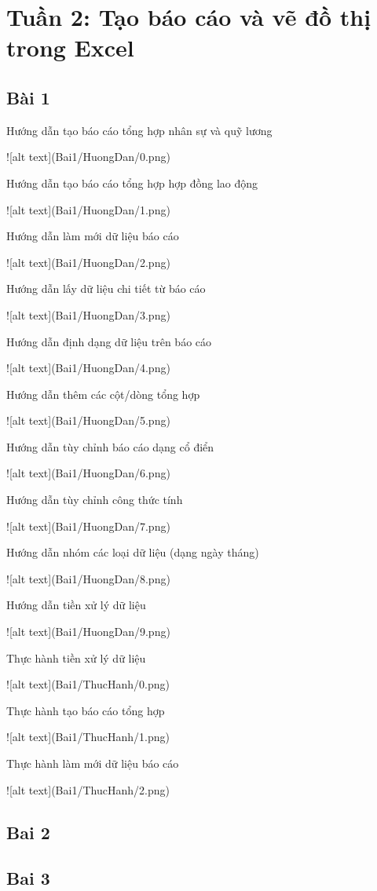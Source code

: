 \documentclass{article}
\begin{document}
\tableofcontents
\newpage
\listoffigures
\newpage
\section{Tuần 2:  Tạo báo cáo và vẽ đồ thị trong Excel}  
\subsection{Bài 1}  

\caption{Hướng dẫn tạo báo cáo tổng hợp nhân sự và quỹ lương}
![alt text](Bai1/HuongDan/0.png)
\caption{Hướng dẫn tạo báo cáo tổng hợp hợp đồng lao động}
![alt text](Bai1/HuongDan/1.png)
\caption{Hướng dẫn làm mới dữ liệu báo cáo}
![alt text](Bai1/HuongDan/2.png)
\caption{Hướng dẫn lấy dữ liệu chi tiết từ báo cáo}
![alt text](Bai1/HuongDan/3.png)
\caption{Hướng dẫn định dạng dữ liệu trên báo cáo}
![alt text](Bai1/HuongDan/4.png)
\caption{Hướng dẫn thêm các cột/dòng tổng hợp}
![alt text](Bai1/HuongDan/5.png)
\caption{Hướng dẫn tùy chỉnh báo cáo dạng cổ điển}
![alt text](Bai1/HuongDan/6.png)
\caption{Hướng dẫn tùy chỉnh công thức tính}
![alt text](Bai1/HuongDan/7.png)
\caption{Hướng dẫn nhóm các loại dữ liệu (dạng ngày tháng)}
![alt text](Bai1/HuongDan/8.png)
\caption{Hướng dẫn tiền xử lý dữ liệu}
![alt text](Bai1/HuongDan/9.png)

\caption{Thực hành tiền xử lý dữ liệu}
![alt text](Bai1/ThucHanh/0.png)
\caption{Thực hành tạo báo cáo tổng hợp}
![alt text](Bai1/ThucHanh/1.png)
\caption{Thực hành làm mới dữ liệu báo cáo}
![alt text](Bai1/ThucHanh/2.png)
\subsection{Bai 2}

\subsection{Bai 3}

\end{document}
